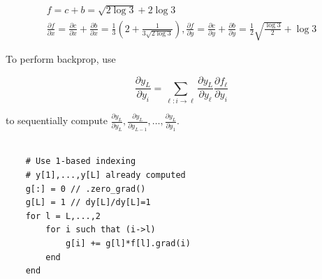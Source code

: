 \documentclass{report}
\begin{document}
\begin{example}
\begin{itemize}
        $$
        \begin{gathered}
        f=c+b=\sqrt{2 \log 3}+2 \log 3 \\
        \frac{\partial f}{\partial x}=\frac{\partial c}{\partial x}+\frac{\partial b}{\partial x}=\frac{1}{3}\left(2+\frac{1}{3 \sqrt{2 \log 3}}\right), \frac{\partial f}{\partial y}=\frac{\partial c}{\partial y}+\frac{\partial b}{\partial y}=\frac{1}{2} \sqrt{\frac{\log 3}{2}}+\log 3
        \end{gathered}
        $$
    \end{itemize}
\end{example}

\begin{definition}
    To perform backprop, use

    $$
    \frac{\partial y_{L}}{\partial y_{i}}=\sum_{\ell: i \rightarrow \ell} \frac{\partial y_{L}}{\partial y_{\ell}} \frac{\partial f_{\ell}}{\partial y_{i}}
    $$

    to sequentially compute $\frac{\partial y_{L}}{\partial y_{L}}, \frac{\partial y_{L}}{\partial y_{L-1}}, \ldots, \frac{\partial y_{L}}{\partial y_{1}}$.\\\\ 

    \begin{verbatim}
    # Use 1-based indexing
    # y[1],...,y[L] already computed
    g[:] = 0 // .zero_grad()
    g[L] = 1 // dy[L]/dy[L]=1
    for l = L,...,2
        for i such that (i->l)
            g[i] += g[l]*f[l].grad(i)
        end
    end
    \end{verbatim}
\end{definition}
\end{document}
